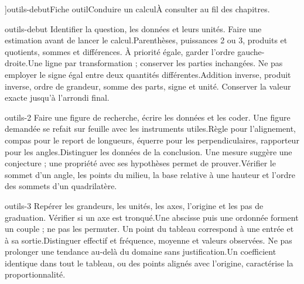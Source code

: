 \editionPage[\pdfbookmark[0]{Fiches outils}{bm-outils-debut-parent}]{outils-debut}{Fiche outil}{Conduire un calcul}{À consulter au fil des chapitres.}
\begin{blocEdition}{outils-debut}
Identifier la question, les données et leurs unités. Faire une estimation avant de lancer le calcul.Parenthèses, puissances 2 ou 3, produits et quotients, sommes et différences. À priorité égale, garder l’ordre gauche-droite.Une ligne par transformation ; conserver les parties inchangées. Ne pas employer le signe égal entre deux quantités différentes.Addition inverse, produit inverse, ordre de grandeur, somme des parts, signe et unité. Conserver la valeur exacte jusqu’à l’arrondi final.
\end{blocEdition}
\begin{blocEdition}{outils-2}
Faire une figure de recherche, écrire les données et les coder. Une figure demandée se refait sur feuille avec les instruments utiles.Règle pour l’alignement, compas pour le report de longueurs, équerre pour les perpendiculaires, rapporteur pour les angles.Distinguer les données de la conclusion. Une mesure suggère une conjecture ; une propriété avec ses hypothèses permet de prouver.Vérifier le sommet d’un angle, les points du milieu, la base relative à une hauteur et l’ordre des sommets d’un quadrilatère.
\end{blocEdition}
\begin{blocEdition}{outils-3}
Repérer les grandeurs, les unités, les axes, l’origine et les pas de graduation. Vérifier si un axe est tronqué.Une abscisse puis une ordonnée forment un couple ; ne pas les permuter. Un point du tableau correspond à une entrée et à sa sortie.Distinguer effectif et fréquence, moyenne et valeurs observées. Ne pas prolonger une tendance au-delà du domaine sans justification.Un coefficient identique dans tout le tableau, ou des points alignés avec l’origine, caractérise la proportionnalité.
\end{blocEdition}
